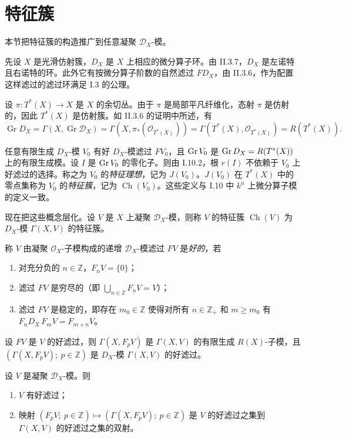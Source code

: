 \section{特征簇}

本节把特征簇的构造推广到任意凝聚 $\mathcal{D}_X$-模。

先设 $X$ 是光滑仿射簇，$D_X$ 是 $X$ 上相应的微分算子环。由 II.3.7，$D_X$ 是左诺特且右诺特的环。此外它有按微分算子阶数的自然滤过 $F D_X$，由 II.3.6，作为配置这样滤过的滤过环满足 I.3 的公理。

设 $\pi:T^*(X)\to X$ 是 $X$ 的余切丛。由于 $\pi$ 是局部平凡纤维化，态射 $\pi$ 是仿射的，因此 $T^*(X)$ 是仿射簇。如 II.3.6 的证明中所述，有
$$\operatorname{Gr}D_X=\Gamma(X,\operatorname{Gr}\mathcal{D}_X)=\Gamma(X,\pi_*(\mathcal{O}_{T^*(X)}))=\Gamma(T^*(X),\mathcal{O}_{T^*(X)})=R(T^*(X)).$$

任意有限生成 $D_X$-模 $V_0$ 有好 $D_X$-模滤过 $F V_0$，且 $\operatorname{Gr} V_0$ 是 $\operatorname{Gr} D_X=R(T^*(X))$ 上的有限生成模。设 $I$ 是 $\operatorname{Gr} V_0$ 的零化子。则由 I.10.2，根 $r(I)$ 不依赖于 $V_0$ 上好滤过的选择。称之为 $V_0$ 的\emph{特征理想}，记为 $J(V_0)$。$J(V_0)$ 在 $T^*(X)$ 中的零点集称为 $V_0$ 的\emph{特征簇}，记为 $\operatorname{Ch}(V_0)$。这些定义与 I.10 中 $k^n$ 上微分算子模的定义一致。

现在把这些概念层化。设 $V$ 是 $X$ 上凝聚 $\mathcal{D}_X$-模，则称 $V$ 的特征簇 $\operatorname{Ch}(V)$ 为 $D_X$-模 $\Gamma(X,V)$ 的特征簇。

称 $V$ 由凝聚 $\mathcal{O}_X$-子模构成的递增 $\mathcal{D}_X$-模滤过 $F V$ 是\emph{好的}，若
\begin{enumerate}[label=(\roman*)]
  \item 对充分负的 $n\in\mathbb{Z}$，$F_nV=\{0\}$；
  \item 滤过 $F V$ 是穷尽的（即 $\bigcup_{n\in\mathbb{Z}}F_nV=V$）；
  \item 滤过 $F V$ 是稳定的，即存在 $m_0\in\mathbb{Z}$ 使得对所有 $n\in\mathbb{Z}_+$ 和 $m\ge m_0$ 有 $F_nD_X\,F_mV=F_{m+n}V$。
\end{enumerate}
设 $F V$ 是 $V$ 的好滤过，则 $\Gamma(X,F_pV)$ 是 $\Gamma(X,V)$ 的有限生成 $R(X)$-子模，且 $(\Gamma(X,F_pV);\ p\in\mathbb{Z})$ 是 $D_X$-模 $\Gamma(X,V)$ 的好滤过。

\begin{lemma}
设 $V$ 是凝聚 $\mathcal{D}_X$-模。则
\begin{enumerate}[label=(\roman*)]
  \item $V$ 有好滤过；
  \item 映射 $(F_pV;\ p\in\mathbb{Z})\longmapsto(\Gamma(X,F_pV);\ p\in\mathbb{Z})$ 是 $V$ 的好滤过之集到 $\Gamma(X,V)$ 的好滤过之集的双射。
\end{enumerate}
\end{lemma}

